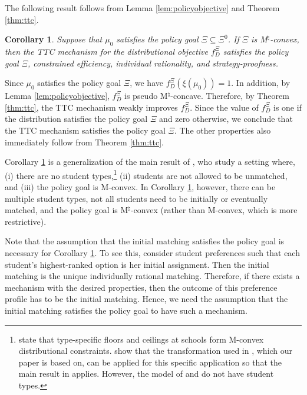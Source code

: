 \documentclass[12pt]{amsart}
\newtheorem{corollary}{Corollary}
\theoremstyle{remark}
\begin{document}
The following result follows from Lemma \ref{lem:policyobjective} and Theorem \ref{thm:ttc}.

\begin{corollary}\label{cor:ttcp}
Suppose that $\mu_0$ satisfies the policy goal $\Xi \subseteq \Xi^0$. If $\Xi$ is M$^{\natural}$-convex, then the TTC mechanism for the distributional
objective $f^{\Xi}_D$
satisfies the policy goal $\Xi$, constrained efficiency, individual rationality, and strategy-proofness.
\end{corollary}

Since $\mu_0$ satisfies the policy goal $\Xi$, we have $f^{\Xi}_D(\xi(\mu_0))=1$. In addition, by Lemma \ref{lem:policyobjective},  $f^{\Xi}_D$
is pseudo M$^{\natural}$-concave. Therefore, by Theorem \ref{thm:ttc}, the TTC mechanism weakly improves
 $f^{\Xi}_D$. Since the value of  $f^{\Xi}_D$ is one if the distribution satisfies the policy goal $\Xi$ and zero otherwise, we conclude that
the TTC mechanism satisfies the policy goal $\Xi$. The other properties also immediately follow from Theorem \ref{thm:ttc}.

Corollary \ref{cor:ttcp} is a generalization of the main result of \cite{suzuki17}, who study a setting where, (i) there are no student types,\footnote{\cite{suzuki17}
state that type-specific floors and ceilings at schools form M-convex distributional constraints. \cite{suzuki2023strategyproof} show that the transformation
used in \cite{interdistrictwp}, which our paper is based on, can be applied for this specific application so that the main result in \cite{suzuki17} applies. However, the model of \cite{suzuki17} and \cite{suzuki2023strategyproof} do not have student types.}
(ii) students are not allowed to be unmatched, and (iii) the policy goal is M-convex. In Corollary \ref{cor:ttcp}, however, there can be multiple student types,
not all students need to be initially or eventually matched, and the policy goal is M$^{\natural}$-convex (rather than M-convex, which is more restrictive).

Note that the assumption that the initial matching satisfies the policy goal is necessary for Corollary \ref{cor:ttcp}. To see this, consider student preferences such that each student's highest-ranked option is her initial assignment. Then the initial matching is the unique individually rational matching. Therefore, if there exists a mechanism with the desired properties, then the outcome of this preference profile has to be the initial matching. Hence, we need the assumption that the initial matching satisfies the policy goal to have such a mechanism.
\end{document}
